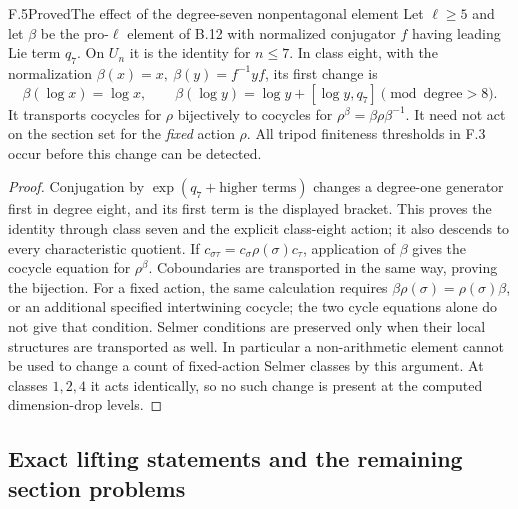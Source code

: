 \begin{statement}{F.5}{Proved}{The effect of the degree-seven nonpentagonal element}
Let $\ell\ge5$ and let $\beta$ be the pro-$\ell$ element
of B.12 with normalized conjugator $f$ having leading
Lie term $q_7$. On $U_n$ it is the identity for $n\le7$.
In class eight, with the normalization
$\beta(x)=x,\ \beta(y)=f^{-1}yf$, its first change is
\[
 \beta(\log x)=\log x,\qquad
 \beta(\log y)=\log y+[\log y,q_7]\pmod{\text{degree}>8}.
\]
It transports cocycles for $\rho$ bijectively to cocycles
for $\rho^\beta=\beta\rho\beta^{-1}$. It need not act
on the section set for the \emph{fixed} action $\rho$.
All tripod finiteness thresholds in F.3 occur before
this change can be detected.
\end{statement}
\begin{proof}
Conjugation by $\exp(q_7+\text{higher terms})$ changes
a degree-one generator first in degree eight, and its
first term is the displayed bracket. This proves the
identity through class seven and the explicit class-eight
action; it also descends to every characteristic quotient.
If $c_{\sigma\tau}=c_\sigma\rho(\sigma)c_\tau$, application
of $\beta$ gives the cocycle equation for $\rho^\beta$.
Coboundaries are transported in the same way, proving
the bijection. For a fixed action, the same calculation
requires $\beta\rho(\sigma)=\rho(\sigma)\beta$, or an
additional specified intertwining cocycle; the two
cycle equations alone do not give that condition.
Selmer conditions are preserved only when their local
structures are transported as well. In particular a
non-arithmetic element cannot be used to change a count
of fixed-action Selmer classes by this argument.
At classes $1,2,4$ it acts identically, so no such
change is present at the computed dimension-drop levels.
\end{proof}



\subsection{Exact lifting statements and the remaining section problems}

